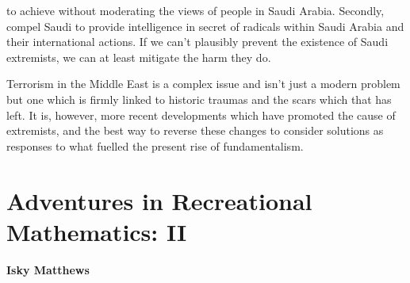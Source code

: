 \documentclass[10pt,a4paper]{article}
\begin{document}
\begin{multicols}{2}
to achieve without moderating the views of people in Saudi Arabia. Secondly, compel Saudi to provide intelligence in secret of radicals within Saudi Arabia and their international actions. If we can’t plausibly prevent the existence of Saudi extremists, we can at least mitigate the harm they do.

Terrorism in the Middle East is a complex issue and isn’t just a modern problem but one which is firmly linked to historic traumas and the scars which that has left. It is, however, more recent developments which have promoted the cause of extremists, and the best way to reverse these changes to consider solutions as responses to what fuelled the present rise of fundamentalism.

\end{multicols}

\section{Adventures in Recreational Mathematics: II}

\textbf{Isky Matthews}
\end{document}
